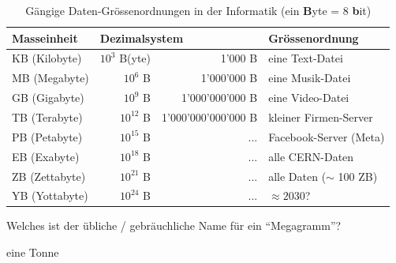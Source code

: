 \begin{table}[H]
	\centering
	\begin{tabular}{@{}l|rr|l@{}}
		\textbf{Masseinheit} & \multicolumn{2}{l|}{\textbf{Dezimalsystem}} & Grössenordnung                                   \\ \midrule
		KB (Kilobyte)        & $10^3$ B(yte)                               & 1'000 B             & eine Text-Datei            \\
		MB (Megabyte)        & $10^6$ B                                    & 1'000'000 B         & eine Musik-Datei           \\
		GB (Gigabyte)        & $10^9$ B                                    & 1'000'000'000 B     & eine Video-Datei           \\
		TB (Terabyte)        & $10^{12}$ B                                 & 1'000'000'000'000 B & kleiner Firmen-Server      \\
		PB (Petabyte)        & $10^{15}$ B                                 & ...                 & Facebook-Server (Meta)     \\
		EB (Exabyte)         & $10^{18}$ B                                 & ...                 & alle CERN-Daten            \\
		ZB (Zettabyte)       & $10^{21}$ B                                 & ...                 & alle Daten ($\sim$ 100 ZB) \\
		YB (Yottabyte)       & $10^{24}$ B                                 & ...                 & $\approx 2030$?            \\
	\end{tabular}
	\caption{Gängige Daten-Grössenordnungen in der Informatik (ein \textbf{B}yte = 8 \textbf{b}it)}
	\label{table:daten-groessenordnungen-kap2}
\end{table}

\begin{myexercise}
	Welches ist der übliche / gebräuchliche Name für ein \enquote{Megagramm}?
	\begin{myanswer}
		eine Tonne
	\end{myanswer}
\end{myexercise}

